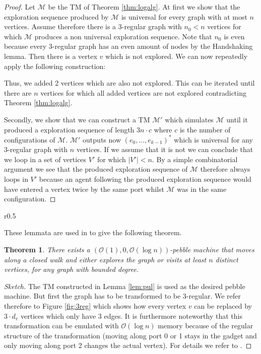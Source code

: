 \documentclass[oneside]{scrartcl}
\newtheorem{thm}{Theorem}
\begin{document}
\begin{proof}
  Let $\mathcal{M}$ be the TM of Theorem \ref{thm:logalg}.
  At first we show that the exploration sequence produced by $\mathcal{M}$ is
  universal for every graph with at most $n$ vertices. Assume therefore there
  is a 3-regular graph with $n_{0} < n$ vertices for which $\mathcal{M}$
  produces a non universal exploration sequence. Note that $n_{0}$ is even
  because every 3-regular graph has an even amount of nodes by the Handshaking
  lemma. Then there is a vertex $v$ which is not explored. We can now
  repeatedly apply the following construction:
  \begin{center}
    \parbox{3\baselineskip}{\resizebox{!}{3\baselineskip}{}}
  \end{center}
  Thus, we added 2 vertices which are also not explored. This can be iterated
  until there are $n$ vertices for which all added vertices are not explored
  contradicting Theorem \ref{thm:logalg}.

  Secondly, we show that we can construct a TM $\mathcal{M}'$ which simulates
  $\mathcal{M}$ until it produced a exploration sequence of length $3n\cdot c$
  where $c$ is the number of configurations of $\mathcal{M}$. $\mathcal{M}'$
  outputs now $(e_{0},\dots,e_{k-1})^{\ast}$ which is universal for any
  3-regular graph with $n$ vertices. If we assume that it is not we can
  conclude that we loop in a set of vertices $V'$ for which $|V'|<n$. By a
  simple combinatorial argument we see that the produced exploration sequence
  of $\mathcal{M}$ therefore always loops in $V'$ because an agent following
  the produced exploration sequence would have entered a vertex twice by the
  same port whilst $\mathcal{M}$ was in the same configuration.
\end{proof}
\begin{wrapfigure}{r}{0.5\textwidth}
  \caption{Illustration how to transform any graph to a 3-regular graph.}
  \label{fig:3reg}
  \flushright{\resizebox{0.4\textwidth}{!}{}}
\end{wrapfigure}
These lemmata are used in \cite{pebbles} to give the following theorem.
\begin{thm}
  \label{thm:pebblewalk}
  There exists a $(\mathcal{O}(1),0,\mathcal{O}(\log n))$-pebble machine
  that moves along a closed walk and either explores the graph or visits
  at least $n$ distinct vertices, for any graph with bounded degree.
\end{thm}
\begin{proof}[Sketch]
  The TM constructed in Lemma \ref{lem:pul} is used as the desired pebble
  machine. But first the graph has to be transformed to be 3-regular.
  We refer therefore to Figure \ref{fig:3reg} which shows how every vertex $v$
  can be replaced by $3\cdot d_{v}$ vertices which only have 3 edges. It is
  furthermore noteworthy that this transformation can be emulated with
  $\mathcal{O}(\log n)$ memory because of the regular structure of the
  transformation (moving along port 0 or 1 stays in the gadget and only
  moving along port 2 changes the actual vertex). For details we refer to
  \cite{pebbles}.
\end{proof}
\end{document}
